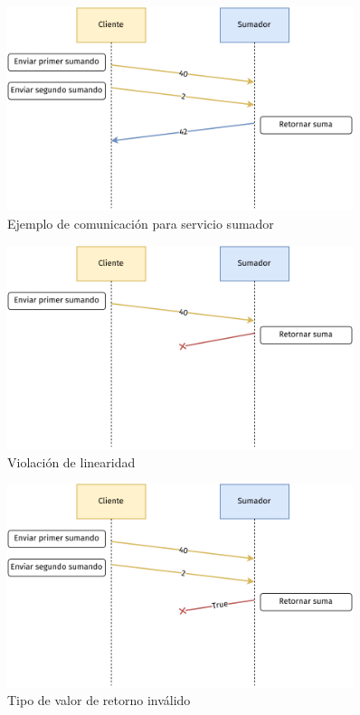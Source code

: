 \begin{frame}{\insertsubsection}
	\begin{figure}
		\centering
		\includegraphics[width=0.9\textwidth]{images/sum-diagram.pdf}
		\caption{Ejemplo de comunicación para servicio sumador}
	\end{figure}
\end{frame}

\begin{frame}{\insertsubsection}
	\begin{figure}
		\centering
		\includegraphics[width=0.9\textwidth]{images/sum-diagram-illegal.pdf}
		\caption{Violación de linearidad}
	\end{figure}
\end{frame}

\begin{frame}{\insertsubsection}
	\begin{figure}
		\centering
		\includegraphics[width=0.9\textwidth]{images/sum-diagram-type-violation.pdf}
		\caption{Tipo de valor de retorno inválido}
	\end{figure}
\end{frame}

